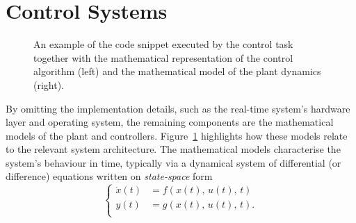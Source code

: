 \section{Control Systems}%
\label{sec:background:ctrl}%
%
\begin{figure}[t]
    \centering
    
    \caption{An example of the code snippet executed by the control task together with the mathematical representation of the control algorithm (left) and the mathematical model of the plant dynamics (right).}
    \label{fig:control-structure-abstraction}
\end{figure}
%
By omitting the implementation details, such as the real-time system's hardware layer and operating system, the remaining components are the mathematical models of the plant and controllers.
Figure~\ref{fig:control-structure-abstraction} highlights how these models relate to the relevant system architecture.
The mathematical models characterise the system's behaviour in time, typically via a dynamical system of differential (or difference) equations written on \emph{state-space} form
%
\begin{equation}%
    \label{eq:state-space}%
    \left\{\begin{aligned}
        \dot{x}(t) &= f(x(t),\, u(t),\, t) \\
        y(t) &= g(x(t),\, u(t),\, t). \\
    \end{aligned}\right.
\end{equation}

